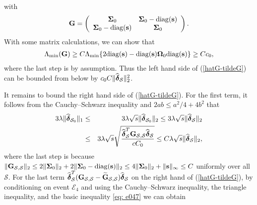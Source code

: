 \documentclass[11pt]{article}
\newcommand{\bs}{\mbox{\bf s}}
\newcommand{\bG}{\mbox{\bf G}}
\newcommand{\bdelta}{\mbox{\boldmath $\delta$}}
\newcommand{\bSig}{\mbox{\boldmath $\Sigma$}}
\newcommand{\bOmg}{\mbox{\boldmath $\Omega$}}
\newcommand{\wh}{\widehat}
\newcommand{\diag}{\mathrm{diag}}
\begin{document}
		with
		\[
		\bG = \left(\begin{array}{cc}\bSig_0 & \bSig_0-\diag(\bs) \\ \bSig_0-\diag(\bs)  &  \bSig_0 \end{array}\right).
		\]
With some matrix calculations, we can show that
		\begin{align*}
		\Lambda_{\min}(\bG) \geq C\Lambda_{\min}\{2\diag(\bs) -\diag(\bs)\bOmg_{0}\diag(\bs)\} \geq Cc_0,
		\end{align*}
		where the last step is by assumption.
		Thus the left hand side of (\ref{hatG-tildeG}) can be bounded from below by $c_0C\|\widehat{\bdelta}_\mathcal{S}\|_2^2$.
		
It remains to bound the right hand side of (\ref{hatG-tildeG}). For the first term, it follows from the Cauchy--Schwarz inequality and $2ab\le a^2/4+4b^2$ that
		\begin{eqnarray}\nonumber
		3\lambda\|\widehat{\bdelta}_{\mathcal{S}_0}\|_1&\le& 3\lambda\sqrt{s}\|\widehat{\bdelta}_{\mathcal{S}_0}\|_2\le 3\lambda\sqrt{s}\|\widehat{\bdelta}_\mathcal{S}\|_2 \\ \label{equ-46} &\le & 3\lambda\sqrt{s}
		\sqrt{\dfrac{\widehat{\bdelta}_\mathcal{S}^T\bG_{\mathcal{S},\mathcal{S}}\widehat{\bdelta}_\mathcal{S}}{cC_0}}
		\le C\lambda\sqrt{s}\|\wh{\bdelta}_\mathcal{S}\|_2, \label{eq: e049}
		\end{eqnarray}
		where the last step is because $\|\bG_{\mathcal{S},\mathcal{S}}\|_2 \leq 2\|\bSig_0\|_2 + 2\|\bSig_0 - \diag(\bs)\|_2 \leq 4\|\bSig_0\|_2 + \|\bs\|_\infty \leq C$ uniformly over all $\mathcal{S}$.
		For the last term $\widehat{\bdelta}_\mathcal{S}^T({\bG}_{\mathcal{S},\mathcal{S}}-\widetilde{\bG}_{\mathcal{S},\mathcal{S}})\widehat{\bdelta}_\mathcal{S}$ on the right hand of (\ref{hatG-tildeG}), by conditioning on event $\mathcal{E}_4$ and using the Cauchy--Schwarz inequality, the triangle inequality, and the basic inequality \eqref{eq: e047} we can obtain
\end{document}
